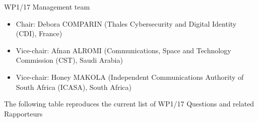 WP1/17 Management team

\begin{itemize}
  \item Chair: Debora COMPARIN (Thales Cybersecurity and Digital Identity (CDI), France)
  \item Vice-chair: Afnan ALROMI (Communications, Space and Technology Commission (CST), Saudi Arabia)
  \item Vice-chair: Honey MAKOLA (Independent Communications Authority of South Africa (ICASA), South Africa)
\end{itemize}

The following table reproduces the current list of WP1/17 Questions and related Rapporteurs

